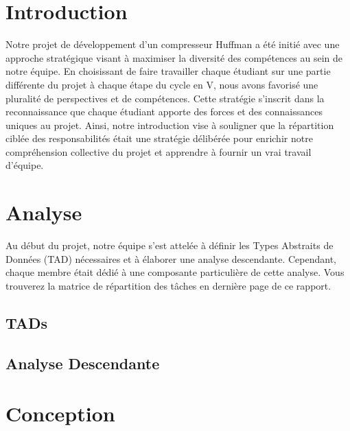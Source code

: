 \documentclass[12pt]{article}
\begin{document}

\newpage

\section{Introduction}
Notre projet de développement d'un compresseur Huffman a été initié avec une approche stratégique visant à maximiser la diversité des compétences au sein de notre équipe. En choisissant de faire travailler chaque étudiant sur une partie différente du projet à chaque étape du cycle en V, nous avons favorisé une pluralité de perspectives et de compétences. Cette stratégie s'inscrit dans la reconnaissance que chaque étudiant apporte des forces et des connaissances uniques au projet. Ainsi, notre introduction vise à souligner que la répartition ciblée des responsabilités était une stratégie délibérée pour enrichir notre compréhension collective du projet et apprendre à fournir un vrai travail d'équipe.
\newpage

\tableofcontents

\listoffigures


\newpage
\section{Analyse}
Au début du projet, notre équipe s'est attelée à définir les Types Abstraits de Données (TAD) nécessaires et à élaborer une analyse descendante. Cependant, chaque membre était dédié à une composante particulière de cette analyse. Vous trouverez la matrice de répartition des tâches en dernière page de ce rapport.\newline
\subsection{TADs}







\subsection{Analyse Descendante}



\newpage
\section{Conception}
\end{document}
